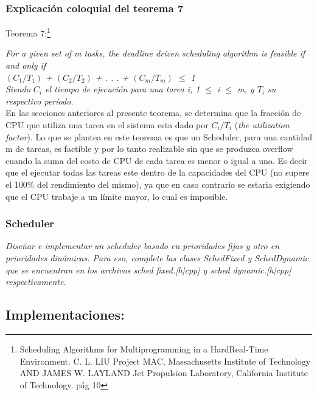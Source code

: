 \documentclass[a4paper]{article}
\begin{document}
 \newpage
\subsubsection{Explicaci\'on coloquial del teorema 7}

Teorema 7:\footnote{Scheduling Algorithms for Multiprogramming in a HardReal-Time Environment.
C. L. LIU Project MAC, Massachusetts Institute of Technology AND JAMES W. LAYLAND Jet Propulsion Laboratory, California Institute of Technology. pág 10}

\textit {For a given set of m tasks, the deadline driven scheduling algorithm
is feasible if and only if }\\
 
 \textit {$(C_1/T_1)$ + $(C_2/T_2)$ + . . . + $(C_m/T_m)$ $\leq$ 1 } \\

\textit{Siendo $C_i$ el tiempo de ejecuci\'on para una tarea i, 1 $\leq$ i $\leq$ m, y $T_i$ su respectivo per\'iodo.}\\

En las secciones anteriores al presente teorema, se determina que la fracción de CPU que utiliza una tarea en el sistema esta dado por $C_i/T_i$ (\textit{the utilization factor}). Lo que se plantea en este teorema es que un Scheduler, para una cantidad m de tareas, es factible y por lo tanto realizable sin que se produzca overflow cuando la suma del costo de CPU de cada tarea es menor o igual a uno. Es decir que el ejecutar todas las tareas este dentro de la capacidades del CPU (no supere el 100\% del rendimiento del mismo), ya que en caso contrario se estaria exigiendo que el CPU trabaje a un l\'imite mayor, lo cual es imposible. \\




\subsubsection{Scheduler}
\textit{Dise\~nar e implementar un scheduler basado en prioridades fijas y otro en prioridades din\'amicas. Para eso, complete las clases SchedFixed y SchedDynamic que se encuentran en los archivos sched fixed.[h|cpp] y sched dynamic.[h|cpp] respectivamente.}\\

\subsection*{Implementaciones:}
\end{document}
